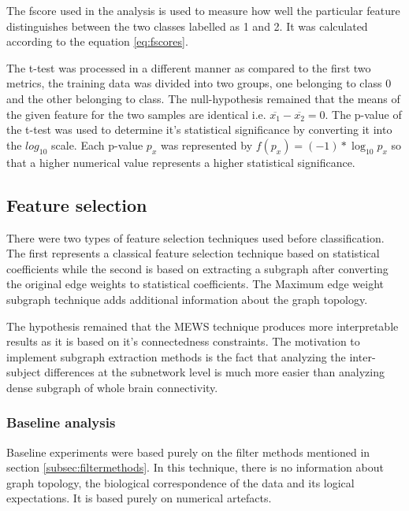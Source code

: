 \documentclass[msthesis.tex]{subfiles}
\begin{document}
The fscore used in the analysis is used to measure how well the particular feature distinguishes between the two classes labelled as 1 and 2. It  was calculated according to the equation \ref{eq:fscores}. 

The t-test was processed in a different manner as compared to the first two metrics, the training data was divided into two groups, one belonging to class 0 and the other belonging to class. The null-hypothesis remained that the means of the given feature for the two samples are identical i.e. $\overline{x_{1}} - \overline{x_{2}} = 0$. The p-value of the t-test was used to determine it's statistical significance by converting it into the $log_10$ scale. Each p-value $p_x$ was represented by $ f(p_{x}) = (-1)*\log_{10} p_x$ so that a higher numerical value represents a higher statistical significance.



\subsection{Feature selection} 
There were two types of feature selection techniques used before classification. The first represents a classical feature selection technique based on statistical coefficients while the second is based on extracting a subgraph after converting the original edge weights to statistical coefficients. The Maximum edge weight subgraph technique adds additional information about the graph topology. 

The hypothesis remained that the MEWS technique produces more interpretable results as it is based on it's connectedness constraints. The motivation to implement subgraph extraction methods is the fact that analyzing the inter-subject differences at the subnetwork level is much more easier than analyzing dense subgraph of whole brain connectivity. 

\subsubsection{Baseline analysis}

Baseline experiments were based purely on the filter methods mentioned in section \ref{subsec:filtermethods}. In this technique, there is no information about graph topology, the biological correspondence of the data and its logical expectations. It is based purely on numerical artefacts. 
\end{document}
